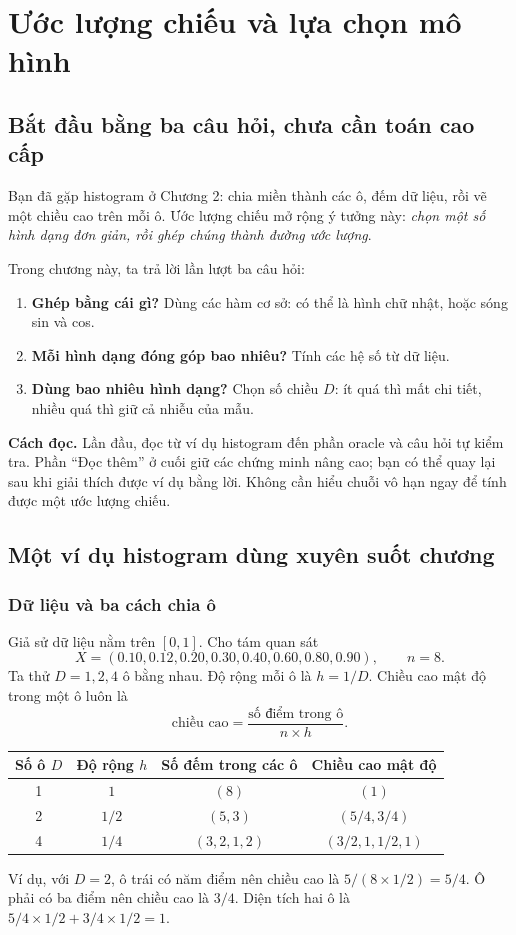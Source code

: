 \chapter{Ước lượng chiếu và lựa chọn mô hình}\label{ch:projection}
\section{Bắt đầu bằng ba câu hỏi, chưa cần toán cao cấp}
Bạn đã gặp histogram ở Chương 2: chia miền thành các ô, đếm dữ liệu,
rồi vẽ một chiều cao trên mỗi ô. Ước lượng chiếu mở rộng ý tưởng này:
\emph{chọn một số hình dạng đơn giản, rồi ghép chúng thành đường ước lượng}.

Trong chương này, ta trả lời lần lượt ba câu hỏi:
\begin{enumerate}
\item \textbf{Ghép bằng cái gì?} Dùng các hàm cơ sở: có thể là hình chữ
nhật, hoặc sóng sin và cos.
\item \textbf{Mỗi hình dạng đóng góp bao nhiêu?} Tính các hệ số từ dữ liệu.
\item \textbf{Dùng bao nhiêu hình dạng?} Chọn số chiều $D$: ít quá thì
mất chi tiết, nhiều quá thì giữ cả nhiễu của mẫu.
\end{enumerate}
\textbf{Cách đọc.} Lần đầu, đọc từ ví dụ histogram đến phần oracle và câu
hỏi tự kiểm tra. Phần ``Đọc thêm'' ở cuối giữ các chứng minh nâng cao;
bạn có thể quay lại sau khi giải thích được ví dụ bằng lời.
Không cần hiểu chuỗi vô hạn ngay để tính được một ước lượng chiếu.


\section{Một ví dụ histogram dùng xuyên suốt chương}
\subsection{Dữ liệu và ba cách chia ô}
Giả sử dữ liệu nằm trên $[0,1]$. Cho tám quan sát
\[
X=(0.10,0.12,0.20,0.30,0.40,0.60,0.80,0.90),\qquad n=8.
\]
Ta thử $D=1,2,4$ ô bằng nhau. Độ rộng mỗi ô là $h=1/D$.
Chiều cao mật độ trong một ô luôn là
\[
\boxed{\text{chiều cao}=\frac{\text{số điểm trong ô}}{n\times h}.}
\]
\begin{center}
\begin{tabular}{cccc}
\toprule Số ô $D$ & Độ rộng $h$ & Số đếm trong các ô & Chiều cao mật độ\\\midrule
1 & $1$ & $(8)$ & $(1)$\\
2 & $1/2$ & $(5,3)$ & $(5/4,3/4)$\\
4 & $1/4$ & $(3,2,1,2)$ & $(3/2,1,1/2,1)$\\\bottomrule
\end{tabular}
\end{center}
Ví dụ, với $D=2$, ô trái có năm điểm nên chiều cao là
$5/(8\times1/2)=5/4$. Ô phải có ba điểm nên chiều cao là $3/4$.
Diện tích hai ô là $5/4\times1/2+3/4\times1/2=1$.

